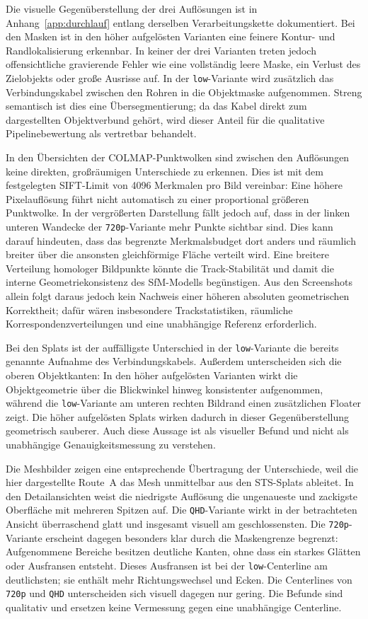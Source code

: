 Die visuelle Gegenüberstellung der drei Auflösungen ist in
Anhang~\ref{app:durchlauf} entlang derselben Verarbeitungskette dokumentiert.
Bei
den Masken ist in den höher aufgelösten Varianten eine feinere Kontur- und
Randlokalisierung erkennbar. In keiner der drei Varianten treten jedoch
offensichtliche gravierende Fehler wie eine vollständig leere Maske, ein
Verlust des Zielobjekts oder große Ausrisse auf. In der \texttt{low}-Variante
wird zusätzlich das Verbindungskabel zwischen den Rohren in die Objektmaske
aufgenommen. Streng semantisch ist dies eine Übersegmentierung; da das Kabel
direkt zum dargestellten Objektverbund gehört, wird dieser Anteil für die
qualitative Pipelinebewertung als vertretbar behandelt.

In den Übersichten der COLMAP-Punktwolken sind zwischen den Auflösungen keine
direkten, großräumigen Unterschiede zu erkennen. Dies ist mit dem festgelegten
SIFT-Limit von 4096 Merkmalen pro Bild vereinbar: Eine höhere Pixelauflösung
führt nicht automatisch zu einer proportional größeren Punktwolke. In der
vergrößerten Darstellung fällt jedoch auf, dass in der linken unteren
Wandecke der \texttt{720p}-Variante mehr Punkte sichtbar sind. Dies kann darauf
hindeuten, dass das begrenzte Merkmalsbudget dort anders und räumlich breiter
über die ansonsten gleichförmige Fläche verteilt wird. Eine breitere Verteilung
homologer Bildpunkte könnte die Track-Stabilität und damit die interne
Geometriekonsistenz des SfM-Modells begünstigen. Aus den Screenshots allein
folgt daraus jedoch kein Nachweis einer höheren absoluten geometrischen
Korrektheit; dafür wären insbesondere Trackstatistiken, räumliche
Korrespondenzverteilungen und eine unabhängige Referenz erforderlich.

Bei den Splats ist der auffälligste Unterschied in der \texttt{low}-Variante
die bereits genannte Aufnahme des Verbindungskabels. Außerdem unterscheiden
sich die oberen Objektkanten: In den höher aufgelösten Varianten wirkt die
Objektgeometrie über die Blickwinkel hinweg konsistenter aufgenommen, während
die \texttt{low}-Variante am unteren rechten Bildrand einen zusätzlichen
Floater zeigt. Die höher aufgelösten Splats wirken dadurch in dieser
Gegenüberstellung geometrisch sauberer. Auch diese Aussage ist als visueller
Befund und nicht als unabhängige Genauigkeitsmessung zu verstehen.

Die Meshbilder zeigen eine entsprechende Übertragung der Unterschiede, weil
die hier dargestellte Route~A das Mesh unmittelbar aus den STS-Splats ableitet.
In den Detailansichten weist die niedrigste Auflösung die ungenaueste und
zackigste Oberfläche mit mehreren Spitzen auf. Die \texttt{QHD}-Variante wirkt
in der betrachteten Ansicht überraschend glatt und insgesamt visuell am
geschlossensten. Die \texttt{720p}-Variante erscheint dagegen besonders klar
durch die Maskengrenze begrenzt: Aufgenommene Bereiche besitzen deutliche
Kanten, ohne dass ein starkes Glätten oder Ausfransen entsteht. Dieses
Ausfransen ist bei der \texttt{low}-Centerline am deutlichsten; sie enthält
mehr Richtungswechsel und Ecken. Die Centerlines von \texttt{720p} und
\texttt{QHD} unterscheiden sich visuell dagegen nur gering. Die Befunde sind
qualitativ und ersetzen keine Vermessung gegen eine unabhängige Centerline.

